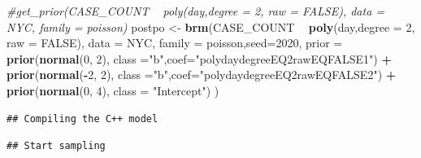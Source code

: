 \documentclass[]{article}
\newenvironment{Shaded}{\begin{snugshade}}{\end{snugshade}}
\newcommand{\CommentTok}[1]{\textcolor[rgb]{0.56,0.35,0.01}{\textit{#1}}}
\newcommand{\DataTypeTok}[1]{\textcolor[rgb]{0.13,0.29,0.53}{#1}}
\newcommand{\DecValTok}[1]{\textcolor[rgb]{0.00,0.00,0.81}{#1}}
\newcommand{\KeywordTok}[1]{\textcolor[rgb]{0.13,0.29,0.53}{\textbf{#1}}}
\newcommand{\NormalTok}[1]{#1}
\newcommand{\OperatorTok}[1]{\textcolor[rgb]{0.81,0.36,0.00}{\textbf{#1}}}
\newcommand{\OtherTok}[1]{\textcolor[rgb]{0.56,0.35,0.01}{#1}}
\newcommand{\StringTok}[1]{\textcolor[rgb]{0.31,0.60,0.02}{#1}}
\begin{document}
\begin{Shaded}
\begin{Highlighting}[]
\CommentTok{#get_prior(CASE_COUNT ~ poly(day,degree = 2, raw = FALSE), data = NYC, family =  poisson)}
\NormalTok{postpo <-}\StringTok{ }\KeywordTok{brm}\NormalTok{(CASE_COUNT }\OperatorTok{~}\StringTok{ }\KeywordTok{poly}\NormalTok{(day,}\DataTypeTok{degree =} \DecValTok{2}\NormalTok{, }\DataTypeTok{raw =} \OtherTok{FALSE}\NormalTok{), }\DataTypeTok{data =}\NormalTok{ NYC, }\DataTypeTok{family =}\NormalTok{  poisson,}\DataTypeTok{seed=}\DecValTok{2020}\NormalTok{, }\DataTypeTok{prior =} 
          \KeywordTok{prior}\NormalTok{(}\KeywordTok{normal}\NormalTok{(}\DecValTok{0}\NormalTok{, }\DecValTok{2}\NormalTok{), }\DataTypeTok{class =}\StringTok{"b"}\NormalTok{,}\DataTypeTok{coef=}\StringTok{"polydaydegreeEQ2rawEQFALSE1"}\NormalTok{) }\OperatorTok{+}
\StringTok{          }\KeywordTok{prior}\NormalTok{(}\KeywordTok{normal}\NormalTok{(}\OperatorTok{-}\DecValTok{2}\NormalTok{, }\DecValTok{2}\NormalTok{), }\DataTypeTok{class =}\StringTok{"b"}\NormalTok{,}\DataTypeTok{coef=}\StringTok{"polydaydegreeEQ2rawEQFALSE2"}\NormalTok{) }\OperatorTok{+}
\StringTok{          }\KeywordTok{prior}\NormalTok{(}\KeywordTok{normal}\NormalTok{(}\DecValTok{0}\NormalTok{, }\DecValTok{4}\NormalTok{), }\DataTypeTok{class =} \StringTok{"Intercept"}\NormalTok{) )}
\end{Highlighting}
\end{Shaded}

\begin{verbatim}
## Compiling the C++ model
\end{verbatim}

\begin{verbatim}
## Start sampling
\end{verbatim}
\end{document}
